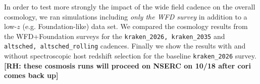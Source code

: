 In order to test more strongly the impact of the wide field cadence on the overall cosmology, we ran simulations including \textit{only the WFD survey} in addition to a low-$z$ (e.g. Foundation-like) data set. We compared the cosmology results from the WFD+Foundation surveys for the {\tt kraken_2026, kraken_2035} and {\tt altsched, altsched_rolling} cadences. Finally we show the results with and without spectroscopic host redshift selection for the baseline {\tt kraken_2026} survey. \textbf{[RH: these cosmosis runs will proceed on NSERC on 10/18 after cori comes back up]}


